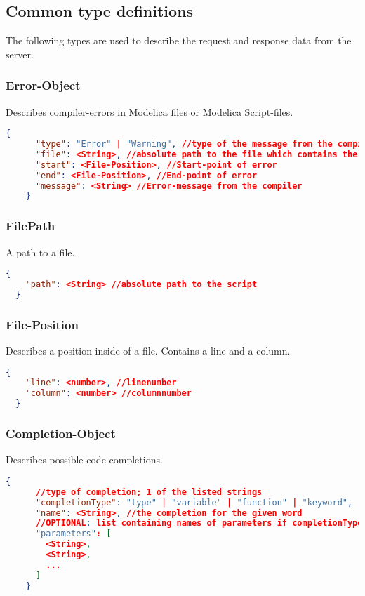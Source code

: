 \subsection{Common type definitions}
The following types are used to describe the request and response data
from the server.

\subsubsection{Error-Object}
Describes compiler-errors in Modelica files or Modelica Script-files.
\newline{}
  \begin{lstlisting}[basicstyle=\small,language=json]
    {
      "type": "Error" | "Warning", //type of the message from the compiler
      "file": <String>, //absolute path to the file which contains the error
      "start": <File-Position>, //Start-point of error
      "end": <File-Position>, //End-point of error
      "message": <String> //Error-message from the compiler
    }
  \end{lstlisting}

\subsubsection{FilePath}
A path to a file.
\newline{}
\begin{lstlisting}[basicstyle=\small,language=json]
  {
    "path": <String> //absolute path to the script
  }
\end{lstlisting}
  
\subsubsection{File-Position}
Describes a position inside of a file. Contains a
line and a column.
\newline{}
  \begin{lstlisting}[basicstyle=\small,language=json]
  {
    "line": <number>, //linenumber
    "column": <number> //columnnumber
  }
  \end{lstlisting}

  \subsubsection{Completion-Object}
  \notimlpemented\newline
  Describes possible code completions.
  \begin{lstlisting}[basicstyle=\small,language=json]
    {
      //type of completion; 1 of the listed strings
      "completionType": "type" | "variable" | "function" | "keyword",
      "name": <String>, //the completion for the given word
      //OPTIONAL: list containing names of parameters if completionType=function
      "parameters": [
        <String>,
        <String>,
        ...
      ]
    }
  \end{lstlisting}
